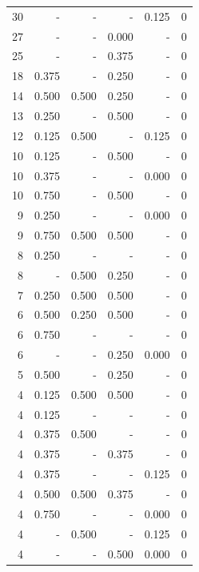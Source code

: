 \documentclass[a4paper]{article}\usepackage{graphicx, color}
\begin{document}
\begin{table}[ht]
\begin{tabular}{rrrrrr}
   \rowcolor{nullColor} 30 & - & - & - & 0.125 & 0 \\ 
   \rowcolor{sosoColor} 27 & - & - & 0.000 & - & 0 \\ 
   \rowcolor{sosoColor} 25 & - & - & 0.375 & - & 0 \\ 
   \rowcolor{sosoColor} 18 & 0.375 & - & 0.250 & - & 0 \\ 
   \rowcolor{badColor} 14 & 0.500 & 0.500 & 0.250 & - & 0 \\ 
   \rowcolor{sosoColor} 13 & 0.250 & - & 0.500 & - & 0 \\ 
  12 & 0.125 & 0.500 & - & 0.125 & 0 \\ 
   \rowcolor{sosoColor} 10 & 0.125 & - & 0.500 & - & 0 \\ 
   \rowcolor{nullColor} 10 & 0.375 & - & - & 0.000 & 0 \\ 
   \rowcolor{sosoColor} 10 & 0.750 & - & 0.500 & - & 0 \\ 
   \rowcolor{nullColor} 9 & 0.250 & - & - & 0.000 & 0 \\ 
   \rowcolor{goodColor} 9 & 0.750 & 0.500 & 0.500 & - & 0 \\ 
   \rowcolor{nullColor} 8 & 0.250 & - & - & - & 0 \\ 
   \rowcolor{badColor} 8 & - & 0.500 & 0.250 & - & 0 \\ 
   \rowcolor{goodColor} 7 & 0.250 & 0.500 & 0.500 & - & 0 \\ 
   \rowcolor{badColor} 6 & 0.500 & 0.250 & 0.500 & - & 0 \\ 
   \rowcolor{nullColor} 6 & 0.750 & - & - & - & 0 \\ 
   \rowcolor{sosoColor} 6 & - & - & 0.250 & 0.000 & 0 \\ 
   \rowcolor{sosoColor} 5 & 0.500 & - & 0.250 & - & 0 \\ 
   \rowcolor{goodColor} 4 & 0.125 & 0.500 & 0.500 & - & 0 \\ 
   \rowcolor{nullColor} 4 & 0.125 & - & - & - & 0 \\ 
  4 & 0.375 & 0.500 & - & - & 0 \\ 
   \rowcolor{sosoColor} 4 & 0.375 & - & 0.375 & - & 0 \\ 
   \rowcolor{nullColor} 4 & 0.375 & - & - & 0.125 & 0 \\ 
  4 & 0.500 & 0.500 & 0.375 & - & 0 \\ 
   \rowcolor{nullColor} 4 & 0.750 & - & - & 0.000 & 0 \\ 
  4 & - & 0.500 & - & 0.125 & 0 \\ 
   \rowcolor{sosoColor} 4 & - & - & 0.500 & 0.000 & 0 \\ 

\end{tabular}
\end{table}
\end{document}
